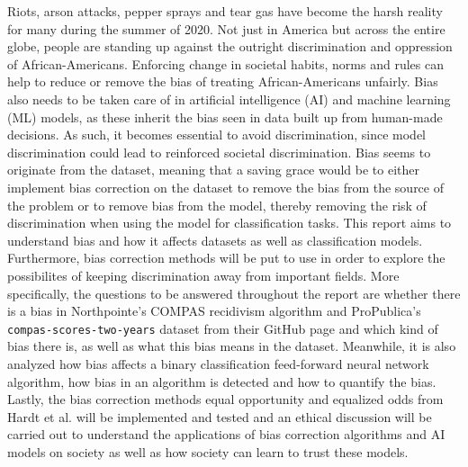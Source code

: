 \documentclass[11pt, fleqn, titlepage]{article}
\begin{document}
	Riots, arson attacks, pepper sprays and tear gas have become the harsh reality for many during the summer of 2020. Not just in America but across the entire globe, people are standing up against the outright discrimination and oppression of African-Americans. \cite{tv2, cnn1, cnn2, euro, guardian} Enforcing change in societal habits, norms and rules can help to reduce or remove the bias of treating African-Americans unfairly. Bias also needs to be taken care of in artificial intelligence (AI) and machine learning (ML) models, as these inherit the bias seen in data built up from human-made decisions. As such, it becomes essential to avoid discrimination, since model discrimination could lead to reinforced societal discrimination. Bias seems to originate from the dataset, meaning that a saving grace would be to either implement bias correction on the dataset to remove the bias from the source of the problem or to remove bias from the model, thereby removing the risk of discrimination when using the model for classification tasks. This report aims to understand bias and how it affects datasets as well as classification models. Furthermore, bias correction methods will be put to use in order to explore the possibilites of keeping discrimination away from important fields. More specifically, the questions to be answered throughout the report are whether there is a bias in Northpointe's COMPAS recidivism algorithm and ProPublica's \texttt{compas-scores-two-years} dataset from their GitHub page and which kind of bias there is, as well as what this bias means in the dataset. Meanwhile, it is also analyzed how bias affects a binary classification feed-forward neural network algorithm, how bias in an algorithm is detected and how to quantify the bias. Lastly, the bias correction methods equal opportunity and equalized odds from Hardt et al. \cite{equal_of_oppor} will be implemented and tested and an ethical discussion will be carried out to understand the applications of bias correction algorithms and AI models on society as well as how society can learn to trust these models. \\
	
\end{document}
